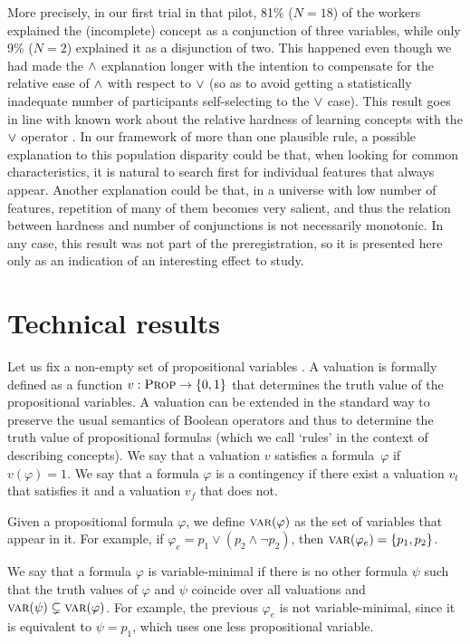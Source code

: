 \begin{appendices}
More precisely, in our first trial in that pilot, 81\% ($N = 18$) of the workers explained the (incomplete) concept as a conjunction of three variables, while only 9\% ($N = 2$) explained it as a disjunction of two. This happened even though we had made the $\land$ explanation longer with the intention to compensate for the relative ease of $\land$ with respect to $\lor$ (so as to avoid getting a statistically inadequate number of participants self-selecting to the $\lor$ case).
This result goes in line with known work about the relative hardness of learning concepts with the $\lor$ operator \cite{bourne1970knowing}. In our framework of more than one plausible rule, a possible explanation to this population disparity could be that, when looking for common characteristics, it is natural to search first for individual features that always appear. Another explanation could be that, in a universe with low number of features, repetition of many of them becomes very salient, and thus the relation between hardness and number of conjunctions is not necessarily monotonic.
In any case, this result was not part of the preregistration, so it is presented here only as an indication of an interesting effect to study.




\section{Technical results}\label{Sec:MainTheoremConcept}
Let us fix a non-empty set of propositional variables \propvars. 
A valuation is formally defined as a function ${v:\textsc{Prop}\rightarrow\{0,1\}}$ that determines the truth value of the propositional variables. A valuation can be extended in the standard way to preserve the usual semantics of Boolean operators and thus to determine the truth value of propositional formulas (which we call `rules' in the context of describing concepts). 
We say that a valuation $v$ satisfies a formula~$\varphi$ if $v(\varphi)=1$. We say that a formula $\varphi$ is a contingency if there exist a valuation $v_t$ that satisfies it and a valuation $v_f$ that does not.


Given a propositional formula $\varphi$, we define $\textsc{var}(\varphi)$ as the set of variables that appear in it. For example, if $\varphi_{e} = p_1 \lor (p_2 \land \lnot p_2)$, then $\textsc{var}(\varphi_e) = \{p_1, p_2\}$.

We say that a formula $\varphi$ is variable-minimal if there is no other formula $\psi$ such that the truth values of $\varphi$ and $\psi$ coincide over all valuations and $\textsc{var}(\psi) \subsetneq \textsc{var}(\varphi)$. For example, the previous $\varphi_e$ is not variable-minimal, since it is equivalent to $\psi = p_1$, which uses one less propositional variable. 



\end{appendices}

